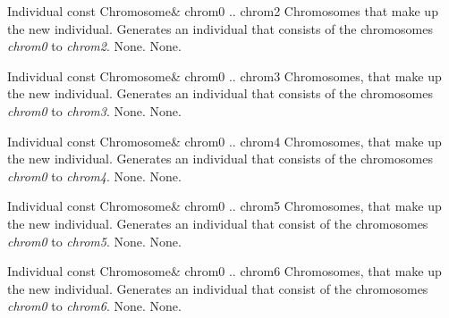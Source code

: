\clearpage

\setNormalInstance
\printMethodWithOneParam
{}
{Individual}
{const Chromosome\&}
{chrom0 .. chrom2}
{Chromosomes that make up the new individual.}
{Generates an individual that consists of the chromosomes
 {\em chrom0} to {\em chrom2}.}
{None.}
{None.}

\vspace*{4ex}

\setNormalInstance
\printMethodWithOneParam
{}
{Individual}
{const Chromosome\&}
{chrom0 .. chrom3}
{Chromosomes, that make up the new individual.}
{Generates an individual that consists of the chromosomes {\em chrom0}
 to {\em chrom3}.}
{None.}
{None.}

\vspace*{4ex}

\setNormalInstance
\printMethodWithOneParam
{}
{Individual}
{const Chromosome\&}
{chrom0 .. chrom4}
{Chromosomes, that make up the new individual.}
{Generates an individual that consists of the chromosomes {\em chrom0} to
 {\em chrom4}.}
{None.}
{None.}

\clearpage

\setNormalInstance
\printMethodWithOneParam
{}
{Individual}
{const Chromosome\&}
{chrom0 .. chrom5}
{Chromosomes, that make up the new individual.}
{Generates an individual that consist of the chromosomes {\em chrom0}
 to {\em chrom5}.}
{None.}
{None.}

\vspace*{4ex}

\setNormalInstance
\printMethodWithOneParam
{}
{Individual}
{const Chromosome\&}
{chrom0 .. chrom6}
{Chromosomes, that make up the new individual.}
{Generates an individual that consist of the chromosomes {\em chrom0} to
 {\em chrom6}.}
{None.}
{None.}

